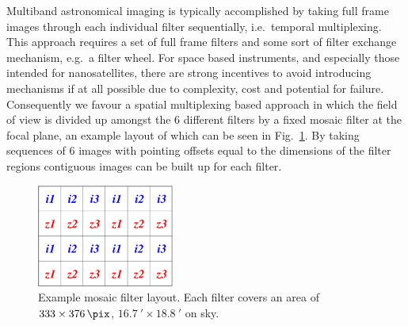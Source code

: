 \documentclass[]{iac}
\begin{document}
Multiband astronomical imaging is typically accomplished by taking full frame images through each individual filter
sequentially, i.e.\ temporal multiplexing. This approach requires a set of full frame filters and some sort of filter
exchange mechanism, e.g.\ a filter wheel. For space based instruments, and especially those intended for nanosatellites,
there are strong incentives to avoid introducing mechanisms if at all possible due to complexity, cost and potential for
failure. Consequently we favour a spatial multiplexing based approach in which the field of view is divided up amongst
the 6 different filters by a fixed mosaic filter at the focal plane, an example layout of which can be seen in
Fig.~\ref{fig:mosaic}. By taking sequences of 6 images with pointing offsets equal to the dimensions of the filter
regions contiguous images can be built up for each filter.

\begin{figure}[tbp]
  \center \includegraphics[width=0.4\textwidth]{figures/mosaic.pdf}
  \caption{\label{fig:mosaic}Example mosaic filter layout. Each filter covers an area of $333 \times \SI{376}{\pix}$,
    $\SI{16.7}{\arcminute} \times \SI{18.8}{\arcminute}$ on sky.}
\end{figure}
\end{document}
